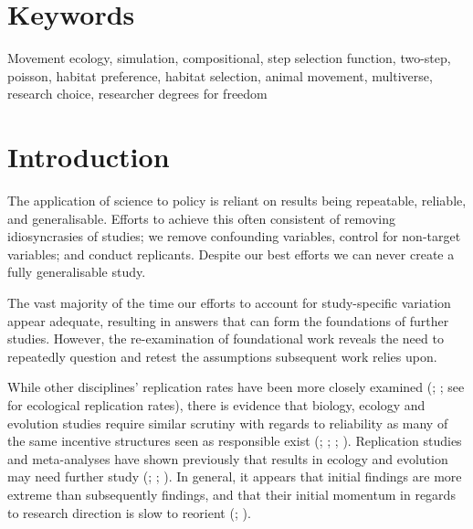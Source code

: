 \documentclass[10pt,a4paper]{article}
\begin{document}
\section*{Keywords}

Movement ecology, simulation, compositional, step selection function, two-step, poisson, habitat preference, habitat selection, animal movement, multiverse, research choice, researcher degrees for freedom

\clearpage
\pagestyle{fancy}

\section{Introduction}\label{introduction}

The application of science to policy is reliant on results being repeatable, reliable, and generalisable.
Efforts to achieve this often consistent of removing idiosyncrasies of studies; we remove confounding variables, control for non-target variables; and conduct replicants.
Despite our best efforts we can never create a fully generalisable study.

The vast majority of the time our efforts to account for study-specific variation appear adequate, resulting in answers that can form the foundations of further studies.
However, the re-examination of foundational work reveals the need to repeatedly question and retest the assumptions subsequent work relies upon.

While other disciplines' replication rates have been more closely examined (; ; see  for ecological replication rates), there is evidence that biology, ecology and evolution studies require similar scrutiny with regards to reliability as many of the same incentive structures seen as responsible exist (; ; ; ).
Replication studies and meta-analyses have shown previously that results in ecology and evolution may need further study (; ; ).
In general, it appears that initial findings are more extreme than subsequently findings, and that their initial momentum in regards to research direction is slow to reorient (; ).
\end{document}
